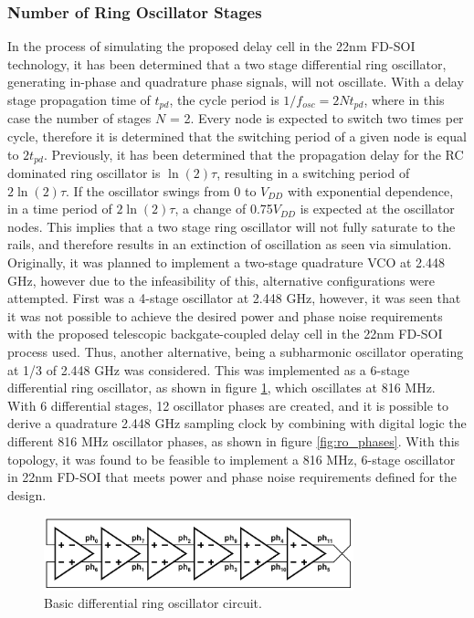 	\subsubsection{Number of Ring Oscillator Stages}\label{sec:num_stages}
	In the process of simulating the proposed delay cell in the 22nm FD-SOI technology, it has been determined that a two stage differential ring oscillator, generating in-phase and quadrature phase signals, will not oscillate. With a delay stage propagation time of $t_{pd}$, the cycle period is $1/f_{osc} = 2Nt_{pd}$, where in this case the number of stages $N$ = 2. Every node is expected to switch two times per cycle, therefore it is determined that the switching period of a given node is equal to $2t_{pd}$. Previously, it has been determined that the propagation delay for the RC dominated ring oscillator is $\ln(2)\tau$, resulting in a switching period of $2\ln(2)\tau$. If the oscillator swings from 0 to $V_{DD}$ with exponential dependence, in a time period of $2\ln(2)\tau$, a change of 0.75$V_{DD}$ is expected at the oscillator nodes. This implies that a two stage ring oscillator will not fully saturate to the rails, and therefore results in an extinction of oscillation as seen via simulation. Originally, it was planned to implement a two-stage quadrature VCO at 2.448 GHz, however due to the infeasibility of this, alternative configurations were attempted. First was a 4-stage oscillator at 2.448 GHz, however, it was seen that it was not possible to achieve the desired power and phase noise requirements with the proposed telescopic backgate-coupled delay cell in the 22nm FD-SOI process used. Thus, another alternative, being a subharmonic oscillator operating at 1/3 of 2.448 GHz was considered. This was implemented as a 6-stage differential ring oscillator, as shown in figure \ref{fig:basic_6stg_ro}, which oscillates at 816 MHz. With 6 differential stages, 12 oscillator phases are created, and it is possible to derive a quadrature 2.448 GHz sampling clock by combining with digital logic the different 816 MHz oscillator phases, as shown in figure \ref{fig:ro_phases}. With this topology, it was found to be feasible to implement a 816 MHz, 6-stage oscillator in 22nm FD-SOI that meets power and phase noise requirements defined for the design.


			\begin{figure}[htb!]
			        \centering
			        \includegraphics[width=0.8\textwidth, angle=0]{./figs/design/ro_6st_simple}
			    \caption{Basic differential ring oscillator circuit.}
			    \label{fig:basic_6stg_ro}
			\end{figure}



